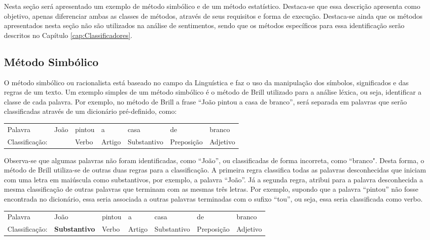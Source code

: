 Nesta seção será apresentado um exemplo de método simbólico e de um método
estatístico.
Destaca-se que essa descrição apresenta como objetivo, apenas
diferenciar ambas as classes de métodos, através de seus requisitos e forma de execução.
Destaca-se ainda que os métodos apresentados nesta seção não são utilizados na
análise de sentimentos, sendo que os métodos específicos para essa
identificação serão descritos no Capítulo \ref{cap:Classificadores}.


\subsection{Método Simbólico}
O método simbólico ou racionalista está
baseado no campo da Linguística e faz o uso da manipulação dos símbolos,
significados e das regras de um texto. Um exemplo simples de um método simbólico
é o método de Brill \cite{Brill:1992:SRP:974499.974526} utilizado para a
análise léxica, ou seja, identificar a classe de cada palavra.
Por exemplo, no método de Brill a frase ``João pintou a casa de branco'', será separada em palavras que
serão classificadas através de um dicionário pré-definido, como:

\begin{table}[htb]
\centering
\begin{tabular}{l|l|l|l|l|l|l}
Palavra         & João        & pintou & a      & casa        & de
& branco
\\
Classificação:   & 			   & Verbo  & Artigo & Substantivo & Preposição & Adjetivo
\end{tabular}
\label{my-label}
\end{table}

Observa-se que algumas palavras não foram
identificadas, como ``João'', ou classificadas de forma incorreta, como
``branco". Desta forma, o método de Brill utiliza-se de outras duas regras para
a classificação.
A primeira regra classifica todas as palavras desconhecidas que iniciam com uma
letra em maiúscula como substantivos, por exemplo, a palavra ``João''. Já a
segunda regra, atribui para a palavra desconhecida a mesma classificação de outras palavras que terminam com as mesmas três letras. Por exemplo, supondo
que a palavra ``pintou'' não fosse encontrada no dicionário, essa seria
associada a outras palavras terminadas com o sufixo ``tou'', ou seja, essa seria
classificada como verbo.

\begin{table}[htb]
\centering
\begin{tabular}{l|l|l|l|l|l|l}
Palavra         & João        & pintou & a      & casa        & de
& branco
\\
Classificação:   & \textbf{Substantivo} & Verbo  & Artigo & Substantivo &
Preposição & Adjetivo
\end{tabular}
\label{my-label}
\end{table}




